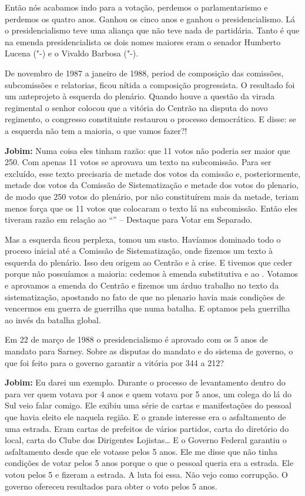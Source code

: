 Então nós acabamos indo para a votação, perdemos o parlamentarismo e
perdemos os quatro anos. Ganhou os cinco anos e ganhou o
presidencialismo. Lá o presidencialismo teve uma aliança que não teve
nada de partidária. Tanto é que na emenda presidencialista os dois nomes
maiores eram o senador Humberto Lucena ("-) e o Vivaldo Barbosa
("-).

De novembro de 1987 a janeiro de 1988, period de composição das
comissões, subcomissões e relatorias, ficou nítida a composição
progressista. O resultado foi um anteprojeto à esquerda do plenário.
Quando houve a questão da virada regimental o senhor colocou que a
vitória do Centrão na disputa do novo regimento, o congresso
constituinte restaurou o processo democrático. E disse: se a esquerda
não tem a maioria, o que vamos fazer?!

\textbf{Jobim:} Numa coisa eles tinham razão: que 11 votos não poderia
ser maior que 250. Com apenas 11 votos se aprovava um texto na
subcomissão. Para ser excluído, esse texto precisaria de metade dos
votos da comissão e, posteriormente, metade dos votos da Comissão de
Sistematização e metade dos votos do plenario, de modo que 250 votos do
plenário, por não constituírem mais da metade, teriam menos força que os
11 votos que colocaram o texto lá na subcomissão. Então eles tiveram
razão em relação ao ``'' -- Destaque para Votar em Separado.

Mas a esquerda ficou perplexa, tomou um susto. Havíamos dominado todo o
proceso inicial até a Comissão de Sistematização, onde fizemos um texto
à esquerda do plenário. Isso deu origem ao Centrão e à crise. E tivemos
que ceder porque não possuíamos a maioria: cedemos à emenda substitutiva
e ao . Votamos e aprovamos a emenda do Centrão e fizemos um árduo
trabalho no texto da sistematização, apostando no fato de que no
plenario havia mais condições de vencermos em guerra de guerrilha que
numa batalha. E optamos pela guerrilha ao invés da batalha global.

Em 22 de março de 1988 o presidencialismo é aprovado com os 5 anos de
mandato para Sarney. Sobre as disputas do mandato e do sistema de
governo, o que foi feito para o governo garantir a vitória por 344 a
212?

\textbf{Jobim:} Eu darei um exemplo. Durante o processo de levantamento
dentro do  para ver quem votava por 4 anos e quem votava por 5 anos,
um colega do  lá do Sul veio falar comigo. Ele exibiu uma série de
cartas e manifestações do pessoal que havia eleito ele naquela região. E
o grande interesse era o asfaltamento de uma estrada. Eram cartas de
prefeitos de vários partidos, carta do diretório do  local, carta do
Clube dos Dirigentes Lojistas\ldots{} E o Governo Federal garantiu o
asfaltamento desde que ele votasse pelos 5 anos. Ele me disse que não
tinha condições de votar pelos 5 anos porque o que o pessoal queria era
a estrada. Ele votou pelos 5 e fizeram a estrada. A luta foi essa. Não
vejo como corrupção. O governo ofereceu resultados para obter o voto
pelos 5 anos.

